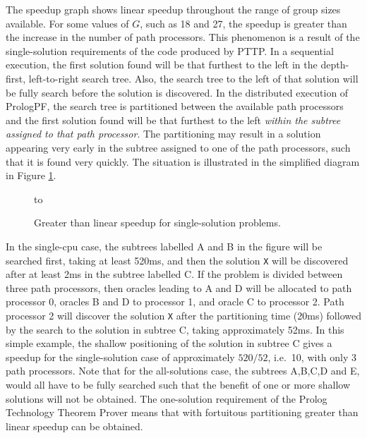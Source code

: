 The speedup graph shows linear speedup throughout the range of group sizes available.
For some values of $G$, such as 18 and 27, the speedup is greater than the increase in
the number of path processors.  This phenomenon is a result of the single-solution
requirements of the code produced by PTTP.  In a sequential execution, the first
solution found will be that furthest to the left in the depth-first, left-to-right
search tree.  Also, the search tree to the left of that solution will be fully
search before the solution is discovered.  In the distributed execution of PrologPF,
the search tree is partitioned between the available path processors and the first
solution found will be that furthest to the left \textit{within the subtree assigned to
that path processor}.  The partitioning may result in a solution appearing very early
in the subtree assigned to one of the path processors, such that it is found very
quickly.  The situation is illustrated in the simplified diagram in Figure \ref{super_linear}.

\begin{figure}[htb]
\vspace{5mm} \hbox to 
\caption{Greater than linear speedup for single-solution problems.}
\vspace{5mm}
\label{super_linear}
\end{figure}

In the single-cpu case, the subtrees labelled A and B in the figure will be searched
first, taking at least 520ms, and then the solution \texttt{X} 
will be discovered after at least 2ms in the subtree labelled C.
If the problem is divided between three path processors,
then oracles leading to A and D will be allocated to path processor 0, oracles
B and D to processor 1, and oracle C to processor 2. Path processor 2 will
discover the solution \texttt{X} 
after the partitioning time (20ms) followed by the search to
the solution in subtree C, taking approximately 52ms.  In this simple example, the
shallow positioning of the solution in subtree C gives a speedup for the single-solution
case of approximately $520/52$, i.e.\ 10, with only 3 path processors.
Note that for the all-solutions case,
the subtrees A,B,C,D and E, would all have to be fully searched such that the benefit of
one or more shallow solutions will not be obtained.
The one-solution requirement of the Prolog Technology Theorem Prover means that with
fortuitous partitioning greater than linear speedup can be obtained.

